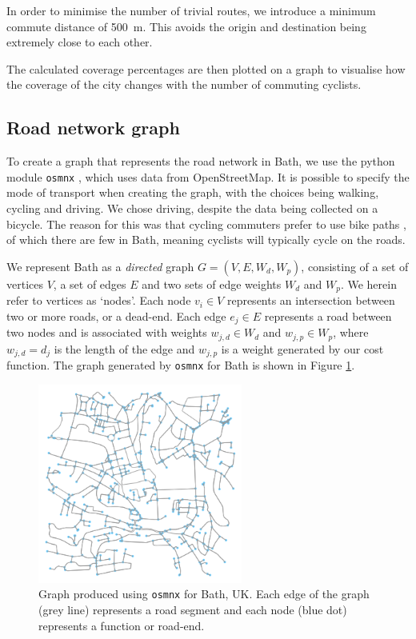 \documentclass[11pt]{report}
\begin{document}
In order to minimise the number of trivial routes, we introduce a minimum commute distance of 500~m. This avoids the origin and destination being extremely close to each other.

The calculated coverage percentages are then plotted on a graph to visualise how the coverage of the city changes with the number of commuting cyclists.


\subsection{Road network graph} \label{network_graph}

To create a graph that represents the road network in Bath, we use the python module \texttt{osmnx} \citep{boeing2017osmnx}, which uses data from OpenStreetMap. It is possible to specify the mode of transport when creating the graph, with the choices being walking, cycling and driving. We chose driving, despite the data being collected on a bicycle. The reason for this was that cycling commuters prefer to use bike paths \citep{skov_petersen2018cyclingpreferences, broach2012wherecyclistsride}, of which there are few in Bath, meaning cyclists will typically cycle on the roads.

We represent Bath as a \textit{directed} graph $G = (V, E, W_d, W_p)$, consisting of a set of vertices $V$, a set of edges $E$ and two sets of edge weights $W_d$ and $W_p$. We herein refer to vertices as `nodes'. Each node $v_i \in V$ represents an intersection between two or more roads, or a dead-end. Each edge $e_j \in E$ represents a road between two nodes and is associated with weights $w_{j, d} \in W_d$ and $w_{j, p} \in W_p$, where $w_{j, d} = d_j$ is the length of the edge and $w_{j, p}$ is a weight generated by our cost function. The graph generated by \texttt{osmnx} for Bath is shown in Figure \ref{fig:network_graph}.

\begin{figure}[!tb]
\centering
\includegraphics[width=0.6\textwidth]{images/network_graph}
\caption{Graph produced using \texttt{osmnx} for Bath, UK. Each edge of the graph (grey line) represents a road segment and each node (blue dot) represents a function or road-end.}
\label{fig:network_graph}
\end{figure}
\end{document}

